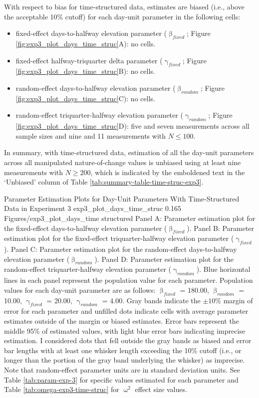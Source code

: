 \documentclass[
12pt, %
twoside,
english]{guelphthesis}
\begin{document}
With respect to bias for time-structured data, estimates are biased (i.e., above the acceptable 10\% cutoff) for each day-unit parameter in the following cells:
\begin{itemize}
\tightlist
\item
  fixed-effect days-to-halfway elevation parameter (\(\upbeta_{fixed}\); Figure \ref{fig:exp3_plot_days_time_struc}A): no cells.
\item
  fixed-effect halfway-triquarter delta parameter (\(\upgamma_{fixed}\); Figure \ref{fig:exp3_plot_days_time_struc}B): no cells.
\item
  random-effect days-to-halfway elevation parameter (\(\upbeta_{random}\); Figure \ref{fig:exp3_plot_days_time_struc}C): no cells.
\item
  random-effect triquarter-halfway elevation parameter (\(\upgamma_{random}\); Figure \ref{fig:exp3_plot_days_time_struc}D): five and seven measurements across all sample sizes and nine and 11 measurements with \(N \le 100\).
\end{itemize}
In summary, with time-structured data, estimation of all the day-unit parameters across all manipulated nature-of-change values is unbiased using at least nine measurements with \(N \ge 200\), which is indicated by the emboldened text in the `Unbiased' column of Table \ref{tab:summary-table-time-struc-exp3}.
\begin{apaFigure}
[portrait]
[samepage]
[-0.2cm]
{Parameter Estimation Plots for Day-Unit Parameters With Time-Structured Data in Experiment 3}
{exp3_plot_days_time_struc}
{0.165}
{Figures/exp3_plot_days_time structured}
{Panel A: Parameter estimation plot for the fixed-effect days-to-halfway elevation parameter ($\upbeta_{fixed}$). Panel B: Parameter estimation plot for the fixed-effect triquarter-halfway elevation parameter ($\upgamma_{fixed}$). Panel C: Parameter estimation plot for the random-effect days-to-halfway elevation parameter ($\upbeta_{random}$). Panel D: Parameter estimation plot for the random-effect triquarter-halfway elevation parameter ($\upgamma_{random}$). Blue horizontal lines in each panel represent the population value for each parameter. Population values for each day-unit parameter are as follows: $\upbeta_{fixed}$ = 180.00, $\upbeta_{random}$ = 10.00, $\upgamma_{fixed}$ = 20.00, $\upgamma_{random}$ = 4.00. Gray bands indicate the $\pm 10\%$ margin of error for each parameter and unfilled dots indicate cells with average parameter estimates outside of the margin or biased estimates. Error bars represent the middle 95\% of estimated values, with light blue error bars indicating imprecise estimation. I considered dots that fell outside the gray bands as biased and error bar lengths with at least one whisker length exceeding the 10\% cutoff (i.e., or longer than the portion of the gray band underlying the whisker) as imprecise. Note that random-effect parameter units are in standard deviation units. See Table \ref{tab:param-exp-3} for specific values estimated for each parameter and Table \ref{tab:omega-exp3-time-struc} for $\upomega^2$ effect size values.}
\end{apaFigure}
\end{document}

